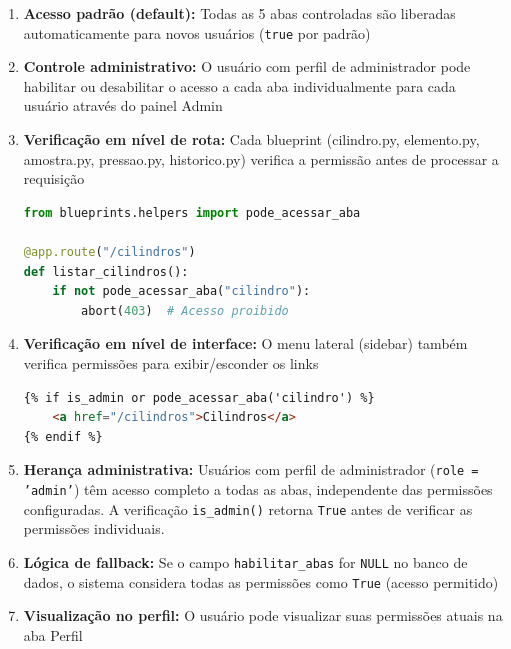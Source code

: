 \documentclass[12pt,a4paper]{article}
\providecommand\关键字[1]{\textbf{#1}}
\begin{document}
\begin{enumerate}
\item \textbf{Acesso padrão (default):} Todas as 5 abas controladas são liberadas automaticamente para novos usuários (\texttt{true} por padrão)

\item \textbf{Controle administrativo:} O usuário com perfil de administrador pode habilitar ou desabilitar o acesso a cada aba individualmente para cada usuário através do painel Admin

\item \textbf{Verificação em nível de rota:} Cada blueprint (cilindro.py, elemento.py, amostra.py, pressao.py, historico.py) verifica a permissão antes de processar a requisição

\begin{lstlisting}[language=Python, caption=Verificação de Permissão em Rota]
from blueprints.helpers import pode_acessar_aba

@app.route("/cilindros")
def listar_cilindros():
    if not pode_acessar_aba("cilindro"):
        abort(403)  # Acesso proibido
\end{lstlisting}

\item \textbf{Verificação em nível de interface:} O menu lateral (sidebar) também verifica permissões para exibir/esconder os links

\begin{lstlisting}[language=HTML, caption=Verificação de Permissão no Template]
{% if is_admin or pode_acessar_aba('cilindro') %}
    <a href="/cilindros">Cilindros</a>
{% endif %}
\end{lstlisting}

\item \textbf{Herança administrativa:} Usuários com perfil de administrador (\texttt{role = 'admin'}) têm acesso completo a todas as abas, independente das permissões configuradas. A verificação \texttt{is\_admin()} retorna \texttt{True} antes de verificar as permissões individuais.

\item \textbf{Lógica de fallback:} Se o campo \texttt{habilitar\_abas} for \texttt{NULL} no banco de dados, o sistema considera todas as permissões como \texttt{True} (acesso permitido)

\item \textbf{Visualização no perfil:} O usuário pode visualizar suas permissões atuais na aba Perfil
\end{enumerate}
\end{document}
